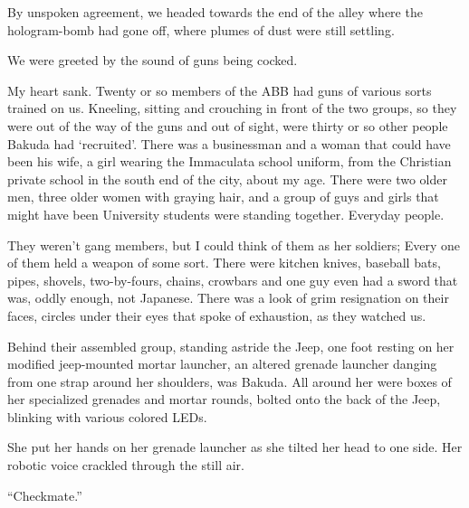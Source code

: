 By unspoken agreement, we headed towards the end of the alley where the hologram-bomb had gone off, where plumes of dust were still settling.



We were greeted by the sound of guns being cocked.



My heart sank.  Twenty or so members of the ABB had guns of various sorts trained on us.  Kneeling, sitting and crouching in front of the two groups, so they were out of the way of the guns and out of sight, were thirty or so other people Bakuda had `recruited'.  There was a businessman and a woman that could have been his wife, a girl wearing the Immaculata school uniform, from the Christian private school in the south end of the city, about my age.  There were two older men, three older women with graying hair, and a group of guys and girls that might have been University students were standing together.  Everyday people.



They weren't gang members, but I could think of them as her soldiers; Every one of them held a weapon of some sort.  There were kitchen knives, baseball bats, pipes, shovels, two-by-fours, chains, crowbars and one guy even had a sword that was, oddly enough, not Japanese.  There was a look of grim resignation on their faces, circles under their eyes that spoke of exhaustion, as they watched us.



Behind their assembled group, standing astride the Jeep, one foot resting on her modified jeep-mounted mortar launcher, an altered grenade launcher danging from one strap around her shoulders, was Bakuda.  All around her were boxes of her specialized grenades and mortar rounds, bolted onto the back of the Jeep, blinking with various colored LEDs.



She put her hands on her grenade launcher as she tilted her head to one side.  Her robotic voice crackled through the still air.



``Checkmate.''





